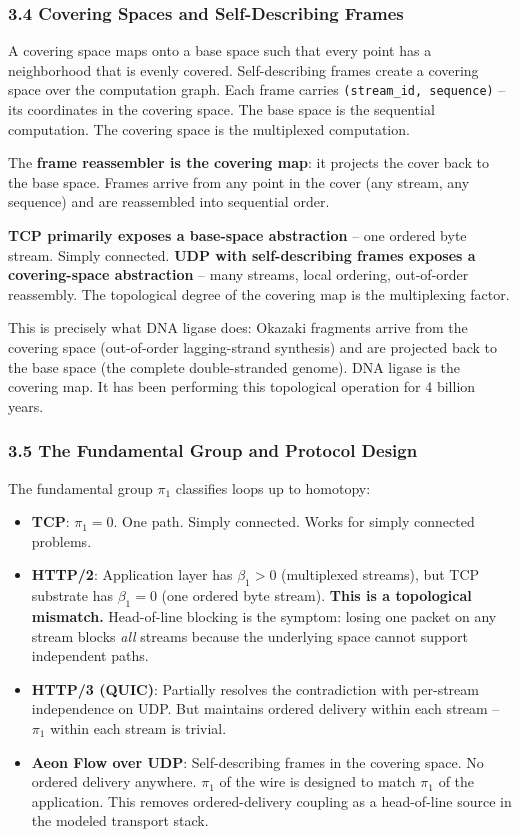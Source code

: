 \documentclass[
  11pt,
]{article}
\begin{document}
\subsubsection{3.4 Covering Spaces and Self-Describing
Frames}\label{covering-spaces-and-self-describing-frames}

A covering space maps onto a base space such that every point has a
neighborhood that is evenly covered. Self-describing frames create a
covering space over the computation graph. Each frame carries
\texttt{(stream\_id,\ sequence)} -- its coordinates in the covering
space. The base space is the sequential computation. The covering space
is the multiplexed computation.

The \textbf{frame reassembler is the covering map}: it projects the
cover back to the base space. Frames arrive from any point in the cover
(any stream, any sequence) and are reassembled into sequential order.

\textbf{TCP primarily exposes a base-space abstraction} -- one ordered
byte stream. Simply connected. \textbf{UDP with self-describing frames
exposes a covering-space abstraction} -- many streams, local ordering,
out-of-order reassembly. The topological degree of the covering map is
the multiplexing factor.

This is precisely what DNA ligase does: Okazaki fragments arrive from
the covering space (out-of-order lagging-strand synthesis) and are
projected back to the base space (the complete double-stranded genome).
DNA ligase is the covering map. It has been performing this topological
operation for 4 billion years.

\subsubsection{3.5 The Fundamental Group and Protocol
Design}\label{the-fundamental-group-and-protocol-design}

The fundamental group \(\pi_1\) classifies loops up to homotopy:

\begin{itemize}
\item
  \textbf{TCP}: \(\pi_1 = 0\). One path. Simply connected. Works for
  simply connected problems.
\item
  \textbf{HTTP/2}: Application layer has \(\beta_1 > 0\) (multiplexed
  streams), but TCP substrate has \(\beta_1 = 0\) (one ordered byte
  stream). \textbf{This is a topological mismatch.} Head-of-line
  blocking is the symptom: losing one packet on any stream blocks
  \emph{all} streams because the underlying space cannot support
  independent paths.
\item
  \textbf{HTTP/3 (QUIC)}: Partially resolves the contradiction with
  per-stream independence on UDP. But maintains ordered delivery within
  each stream -- \(\pi_1\) within each stream is trivial.
\item
  \textbf{Aeon Flow over UDP}: Self-describing frames in the covering
  space. No ordered delivery anywhere. \(\pi_1\) of the wire is designed
  to match \(\pi_1\) of the application. This removes ordered-delivery
  coupling as a head-of-line source in the modeled transport stack.
\end{itemize}
\end{document}
